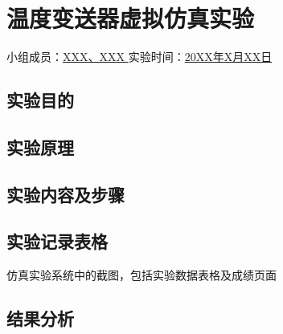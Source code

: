 \section{温度变送器虚拟仿真实验}

\begin{center}
    {
        小组成员：\underline{\quad XXX、XXX \quad} \quad
        实验时间：\underline{\quad 20XX年X月XX日 \quad}
    }
\end{center}

\subsection{实验目的}

\subsection{实验原理}

\subsection{实验内容及步骤}

\subsection{实验记录表格}
仿真实验系统中的截图，包括实验数据表格及成绩页面

\subsection{结果分析}

\newpage